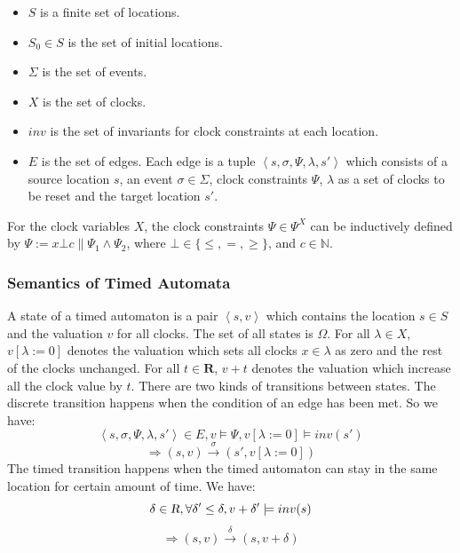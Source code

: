 \begin{itemize}
	\item $S$ is a finite set of locations.
	\item $S_0\in S$ is the set of initial locations.
	\item $\Sigma$ is the set of events.
	\item $X$ is the set of clocks.
	\item $inv$ is the set of invariants for clock constraints at each location.
	\item $E$ is the set of edges. Each edge is a tuple $\left\langle s,\sigma,\Psi,\lambda,s'\right\rangle$ which consists of a source location $s$, an event $\sigma\in\Sigma$, clock constraints $\Psi$, $\lambda$ as a set of clocks to be reset and the target location $s'$.   
\end{itemize}

For the clock variables $X$, the clock constraints $\Psi\in\Psi^X$ can be inductively defined by $\Psi:=x\bot c\|\Psi_1\wedge\Psi_2$, where $\bot\in\{\leq,=,\geq\}$, and $c\in\mathbb{N}$.
\subsubsection{Semantics of Timed Automata}
A state of a timed automaton is a pair $\left\langle s,v\right\rangle$ which contains the location $s\in S$ and the valuation $v$ for all clocks. The set of all states is $\Omega$. For all $\lambda\in X$, $v[\lambda :=0]$ denotes the valuation which sets all clocks $x\in\lambda$ as zero and the rest of the clocks unchanged. For all $t\in \textbf{R}$, $v+t$ denotes the valuation which increase all the clock value by $t$. There are two kinds of transitions between states. The \textsf{discrete transition} happens when the condition of an edge has been met. So we have:
$$\left\langle s,\sigma,\Psi,\lambda,s'\right\rangle\in E,v\models \Psi,v[\lambda :=0]\models inv(s')$$
$$\Rightarrow (s,v)\xrightarrow{\sigma}(s',v[\lambda :=0])$$
The \textsf{timed transition} happens when the timed automaton can stay in the same location for certain amount of time. We have:
$$\delta\in \textsl{R},\forall \delta'\leq\delta, v+\delta'\models inv(s)$$
$$\Rightarrow (s,v)\xrightarrow{\delta}(s,v+\delta)$$



